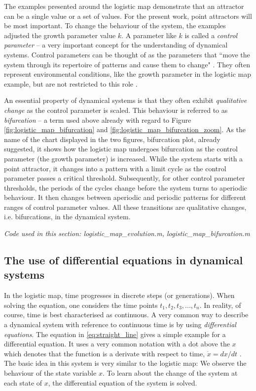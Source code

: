 The examples presented around the logistic map demonstrate that an attractor can be a single value or a set of values. For the present work, point attractors will be most important. To change the behaviour of the system, the examples adjusted the growth parameter value $k$. A parameter like $k$ is called a \emph{control parameter} -- a very important concept for the understanding of dynamical systems. Control parameters can be thought of as the parameters that ``move the system through its repertoire of patterns and cause them to change" \citep[1538]{Kelso2013}. They often represent environmental conditions, like the growth parameter in the logistic map example, but are not restricted to this role \citep{Kelso2013}. 

An essential property of dynamical systems is that they often exhibit \emph{qualitative change} as the control parameter is scaled. This behaviour is referred to as \emph{bifurcation} -- a term used above already with regard to Figure \ref{fig:logistic_map_bifurcation} and \ref{fig:logistic_map_bifurcation_zoom}. As the name of the chart displayed in the two figures, bifurcation plot, already suggested, it shows how the logistic map undergoes bifurcation as the control parameter (the growth parameter) is increased. While the system starts with a point attractor, it changes into a pattern with a limit cycle as the control parameter passes a critical threshold. Subsequently, for other control parameter thresholds, the periods of the cycles change before the system turns to aperiodic behaviour. It then changes between aperiodic and periodic patterns for different ranges of control parameter values. All these transitions are qualitative changes, i.e. bifurcations, in the dynamical system.

\medskip\noindent \textit{Code used in this section: logistic\_map\_evolution.m, logistic\_map\_bifurcation.m}

\subsection{The use of differential equations in dynamical systems}
\label{sec:diff_equations}

In the logistic map, time progresses in discrete steps (or generations). When solving the equation, one considers the time points $t_1, t_2, t_3, ..., t_n$. In reality, of course, time is best characterised as continuous. A very common way to describe a dynamical system with reference to continuous time is by using \emph{differential equations}. The equation in \ref{eq:straight_line} gives a simple example for a differential equation. It uses a very common notation with a dot above the $x$ which denotes that the function is a derivate with respect to time, $\dot{x} = dx/dt$ \citep{Fuchs2013}. The basic idea in this system is very similar to the logistic map: We observe the behaviour of the state variable $x$. To learn about the change of the system at each state of $x$, the differential equation of the system is solved.

